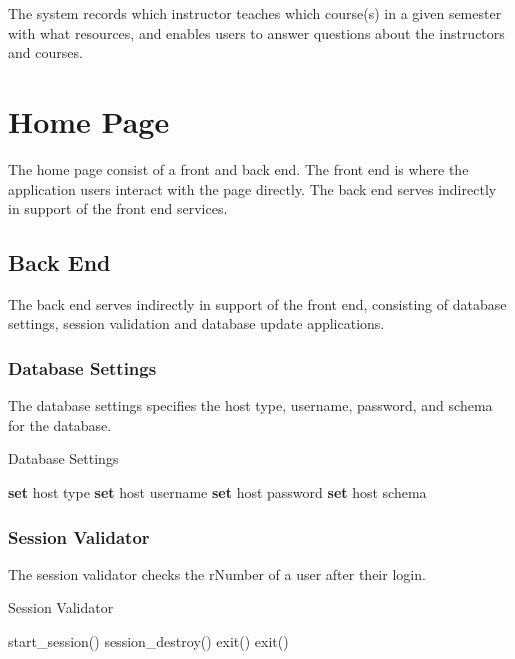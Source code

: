 The system records which instructor teaches which course(s) in a given semester with what resources, and enables users to answer questions about the instructors and courses.	

  


\section{Home Page}
 The home page consist of a front and back end. The front end is where the application users interact with the page directly. The back end serves indirectly in support of the front end services.
	
	\subsection{Back End}
	The back end serves indirectly in support of the front end, consisting of database settings, session validation and database update applications.
	
		\subsubsection{Database Settings}
		The database settings specifies the host type, username, password, and schema for the database.
		\begin{algorithm}[H]
		\caption{Database Settings}
		\begin{algorithmic}[1]
				\State\textbf{set} host type
				\State\textbf{set} host username 
				\State\textbf{set} host password 
				\State\textbf{set} host schema
		\end{algorithmic}		 
		\end{algorithm}
		
		\subsubsection{Session Validator}
		The session validator checks the rNumber of a user after their login. 
		\begin{algorithm}[H]
		\caption{Session Validator}
		\begin{algorithmic}[1]
		\State start\_session()
			\State session\_destroy()
			\State exit()
		\Else
			\State exit()
			\EndIf
		\EndIf
		\end{algorithmic} 
		\end{algorithm}
		
